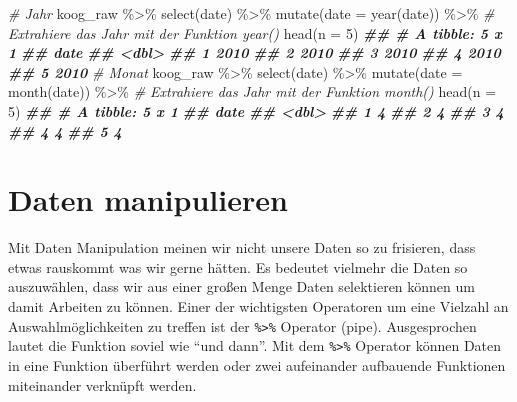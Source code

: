 \documentclass[
]{article}
\newenvironment{Shaded}{\begin{snugshade}}{\end{snugshade}}
\newcommand{\AttributeTok}[1]{\textcolor[rgb]{0.77,0.63,0.00}{#1}}
\newcommand{\CommentTok}[1]{\textcolor[rgb]{0.56,0.35,0.01}{\textit{#1}}}
\newcommand{\DecValTok}[1]{\textcolor[rgb]{0.00,0.00,0.81}{#1}}
\newcommand{\DocumentationTok}[1]{\textcolor[rgb]{0.56,0.35,0.01}{\textbf{\textit{#1}}}}
\newcommand{\FunctionTok}[1]{\textcolor[rgb]{0.00,0.00,0.00}{#1}}
\newcommand{\NormalTok}[1]{#1}
\newcommand{\SpecialCharTok}[1]{\textcolor[rgb]{0.00,0.00,0.00}{#1}}
\begin{document}
\begin{Shaded}
\begin{Highlighting}[]
\CommentTok{\# Jahr}
\NormalTok{koog\_raw }\SpecialCharTok{\%\textgreater{}\%}
  \FunctionTok{select}\NormalTok{(date) }\SpecialCharTok{\%\textgreater{}\%}
  \FunctionTok{mutate}\NormalTok{(}\AttributeTok{date =} \FunctionTok{year}\NormalTok{(date)) }\SpecialCharTok{\%\textgreater{}\%} \CommentTok{\# Extrahiere das Jahr mit der Funktion \textasciigrave{}year()\textasciigrave{}}
  \FunctionTok{head}\NormalTok{(}\AttributeTok{n =} \DecValTok{5}\NormalTok{)}
\DocumentationTok{\#\# \# A tibble: 5 x 1}
\DocumentationTok{\#\#    date}
\DocumentationTok{\#\#   \textless{}dbl\textgreater{}}
\DocumentationTok{\#\# 1  2010}
\DocumentationTok{\#\# 2  2010}
\DocumentationTok{\#\# 3  2010}
\DocumentationTok{\#\# 4  2010}
\DocumentationTok{\#\# 5  2010}
\CommentTok{\# Monat}
\NormalTok{koog\_raw }\SpecialCharTok{\%\textgreater{}\%}
  \FunctionTok{select}\NormalTok{(date) }\SpecialCharTok{\%\textgreater{}\%}
  \FunctionTok{mutate}\NormalTok{(}\AttributeTok{date =} \FunctionTok{month}\NormalTok{(date)) }\SpecialCharTok{\%\textgreater{}\%} \CommentTok{\# Extrahiere das Jahr mit der Funktion \textasciigrave{}month()\textasciigrave{}}
  \FunctionTok{head}\NormalTok{(}\AttributeTok{n =} \DecValTok{5}\NormalTok{)}
\DocumentationTok{\#\# \# A tibble: 5 x 1}
\DocumentationTok{\#\#    date}
\DocumentationTok{\#\#   \textless{}dbl\textgreater{}}
\DocumentationTok{\#\# 1     4}
\DocumentationTok{\#\# 2     4}
\DocumentationTok{\#\# 3     4}
\DocumentationTok{\#\# 4     4}
\DocumentationTok{\#\# 5     4}
\end{Highlighting}
\end{Shaded}

\hypertarget{daten-manipulieren}{%
\section{Daten manipulieren}\label{daten-manipulieren}}

Mit Daten Manipulation meinen wir nicht unsere Daten so zu frisieren, dass etwas rauskommt was wir gerne hätten. Es bedeutet vielmehr die Daten so auszuwählen, dass wir aus einer großen Menge Daten selektieren können um damit Arbeiten zu können. Einer der wichtigsten Operatoren um eine Vielzahl an Auswahlmöglichkeiten zu treffen ist der \texttt{\%\textgreater{}\%} Operator (pipe). Ausgesprochen lautet die Funktion soviel wie ``und dann''. Mit dem \texttt{\%\textgreater{}\%} Operator können Daten in eine Funktion überführt werden oder zwei aufeinander aufbauende Funktionen miteinander verknüpft werden.
\end{document}
